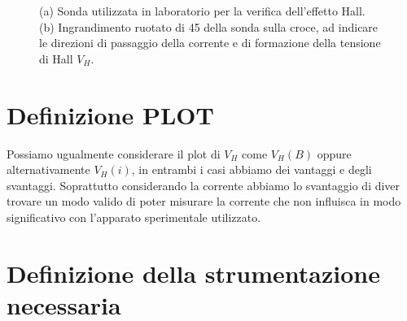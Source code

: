 \documentclass[fleqn,varvw]{memo}
\begin{document}
\begin{figure}
    \caption{(a) Sonda utilizzata in laboratorio per la verifica dell'effetto Hall. (b) Ingrandimento ruotato di \SI{45}{\deg} della sonda sulla croce, ad indicare le direzioni di passaggio della corrente e di formazione della tensione di Hall $V_H$.}\label{fig:1}
\end{figure}

\section{Definizione PLOT}

Possiamo ugualmente considerare il plot di $V_H$ come $V_H(B)$ oppure alternativamente $V_H(i)$, in entrambi i casi abbiamo dei vantaggi e degli svantaggi. Soprattutto considerando la corrente abbiamo lo svantaggio di diver trovare un modo valido di poter misurare la corrente che non influisca in modo significativo con l'apparato sperimentale utilizzato.

\section{Definizione della strumentazione necessaria}
\end{document}
